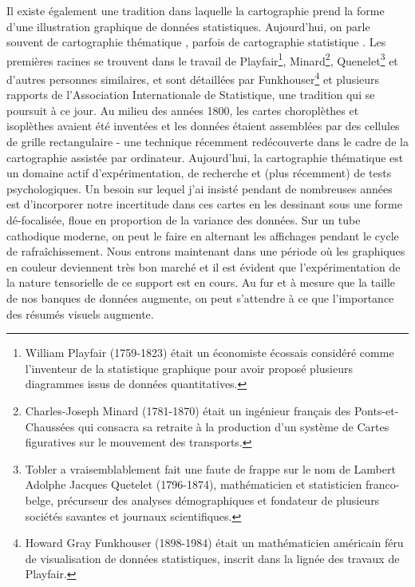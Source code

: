 \documentclass[a4paper,11pt]{article}
\begin{document}
\smallskip

Il existe également une tradition dans laquelle la cartographie prend la forme d'une illustration graphique de données statistiques. Aujourd'hui, on parle souvent de cartographie \og thématique \fg, parfois de cartographie \og statistique \fg. Les premières racines se trouvent dans le travail de Playfair\footnote{\color{notettt}William Playfair (1759-1823) était un économiste écossais considéré comme l'inventeur de la statistique graphique pour avoir proposé plusieurs diagrammes issus de données quantitatives.}, Minard\footnote{\color{notettt}Charles-Joseph Minard (1781-1870) était un ingénieur français des Ponts-et-Chaussées qui consacra sa retraite à la production d’un système de \og Cartes figuratives \fg{} sur le mouvement des transports.}, Quenelet\footnote{\color{notettt}Tobler a vraisemblablement fait une faute de frappe sur le nom de Lambert Adolphe Jacques Quetelet (1796-1874), mathématicien et statisticien franco-belge, précurseur des analyses démographiques et fondateur de plusieurs sociétés savantes et journaux scientifiques.} et d'autres personnes similaires, et sont détaillées par Funkhouser\footnote{\color{notettt}Howard Gray Funkhouser (1898-1984) était un mathématicien américain féru de visualisation de données statistiques, inscrit dans la lignée des travaux de Playfair.} et plusieurs rapports de l'Association Internationale de Statistique, une tradition qui se poursuit à ce jour. Au milieu des années 1800, les cartes choroplèthes et isoplèthes avaient été inventées et les données étaient assemblées par des cellules de grille rectangulaire - une technique récemment \og redécouverte \fg{} dans le cadre de la cartographie assistée par ordinateur. Aujourd'hui, la cartographie thématique est un domaine actif d'expérimentation, de recherche et (plus récemment) de tests psychologiques. Un besoin sur lequel j'ai insisté pendant de nombreuses années est d'incorporer notre incertitude dans ces cartes en les dessinant sous une forme dé-focalisée, floue en proportion de la variance des données. Sur un tube cathodique moderne, on peut le faire en alternant les affichages pendant le cycle de rafraîchissement. Nous entrons maintenant dans une période où les graphiques en couleur deviennent très bon marché et il est évident que l'expérimentation de la nature tensorielle de ce support est en cours. Au fur et à mesure que la taille de nos banques de données augmente, on peut s'attendre à ce que l'importance des résumés visuels augmente.

\smallskip
\end{document}
